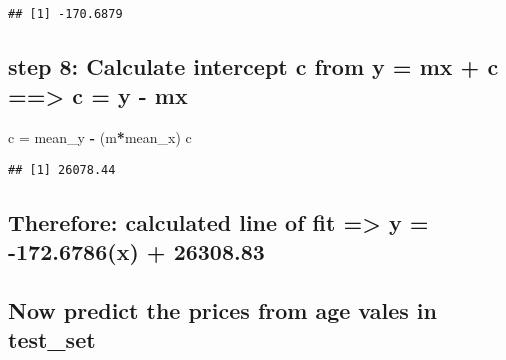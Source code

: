 \documentclass[]{article}
\newenvironment{Shaded}{\begin{snugshade}}{\end{snugshade}}
\newcommand{\ControlFlowTok}[1]{\textcolor[rgb]{0.13,0.29,0.53}{\textbf{#1}}}
\newcommand{\DataTypeTok}[1]{\textcolor[rgb]{0.13,0.29,0.53}{#1}}
\newcommand{\DecValTok}[1]{\textcolor[rgb]{0.00,0.00,0.81}{#1}}
\newcommand{\FloatTok}[1]{\textcolor[rgb]{0.00,0.00,0.81}{#1}}
\newcommand{\KeywordTok}[1]{\textcolor[rgb]{0.13,0.29,0.53}{\textbf{#1}}}
\newcommand{\NormalTok}[1]{#1}
\newcommand{\OperatorTok}[1]{\textcolor[rgb]{0.81,0.36,0.00}{\textbf{#1}}}
\newcommand{\StringTok}[1]{\textcolor[rgb]{0.31,0.60,0.02}{#1}}
\begin{document}
\begin{verbatim}
## [1] -170.6879
\end{verbatim}

\hypertarget{step-8-calculate-intercept-c-from-y-mx-c-c-y---mx}{%
\subsection{step 8: Calculate intercept c from y = mx + c
==\textgreater{} c = y -
mx}\label{step-8-calculate-intercept-c-from-y-mx-c-c-y---mx}}

\begin{Shaded}
\begin{Highlighting}[]
\NormalTok{c =}\StringTok{ }\NormalTok{mean_y }\OperatorTok{-}\StringTok{ }\NormalTok{(m}\OperatorTok{*}\NormalTok{mean_x)}
\NormalTok{c}
\end{Highlighting}
\end{Shaded}

\begin{verbatim}
## [1] 26078.44
\end{verbatim}

\hypertarget{therefore-calculated-line-of-fit-y--172.6786x-26308.83}{%
\subsection{Therefore: calculated line of fit =\textgreater{} y =
-172.6786(x) +
26308.83}\label{therefore-calculated-line-of-fit-y--172.6786x-26308.83}}

\hypertarget{now-predict-the-prices-from-age-vales-in-test_set}{%
\subsection{Now predict the prices from age vales in
test\_set}\label{now-predict-the-prices-from-age-vales-in-test_set}}

\begin{Shaded}
\end{Shaded}
\end{document}
